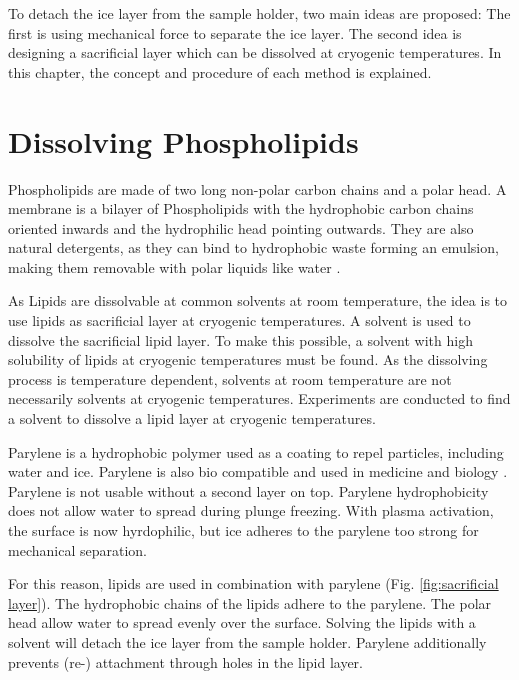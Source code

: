 
To detach the ice layer from the sample holder, two main ideas are proposed: The first is using mechanical force to separate the ice layer. The second idea is designing a sacrificial layer which can be dissolved at cryogenic temperatures. In this chapter, the concept and procedure of each method is explained.

\section{Dissolving Phospholipids}

Phospholipids are made of two long non-polar carbon chains and a polar head. A membrane is a bilayer of Phospholipids with the hydrophobic carbon chains oriented inwards and the hydrophilic head pointing outwards. They are also natural detergents, as they can bind to hydrophobic waste forming an emulsion, making them removable with polar liquids like water \cite{SriramaM.BhairiPh.D..2001}.

As Lipids are dissolvable at common solvents at room temperature, the idea is to use lipids as sacrificial layer at cryogenic temperatures. A solvent is used to dissolve the sacrificial lipid layer. To make this possible, a solvent with high solubility of lipids at cryogenic temperatures must be found. As the dissolving process is temperature dependent, solvents at room temperature are not necessarily solvents at cryogenic temperatures. Experiments are conducted to find a solvent to dissolve a lipid layer at cryogenic temperatures.


Parylene is a hydrophobic polymer used as a coating to repel particles, including water and ice. Parylene is also bio compatible and used in medicine and biology \cite{comelec.}. Parylene is not usable without a second layer on top. Parylene hydrophobicity does not allow water to spread during plunge freezing. With plasma activation, the surface is now hyrdophilic, but ice adheres to the parylene too strong for mechanical separation. %

For this reason, lipids are used in combination with parylene (Fig. \ref{fig:sacrificial layer}). The hydrophobic chains of the lipids adhere to the parylene. The polar head allow water to spread evenly over the surface. Solving the lipids with a solvent will detach the ice layer from the sample holder. Parylene additionally prevents (re-) attachment through holes in the lipid layer. 

